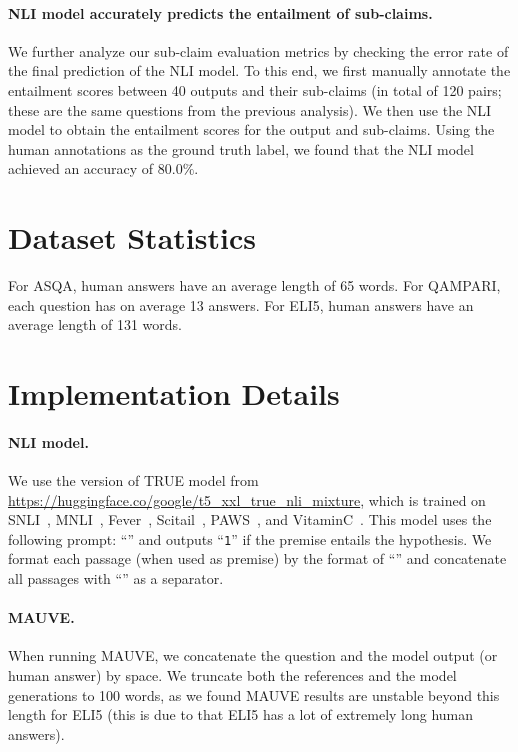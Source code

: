 \paragraph{NLI model accurately predicts the entailment of sub-claims.}
We further analyze our sub-claim evaluation metrics by checking the error rate of the final prediction of the NLI model.
To this end, we first manually annotate the entailment scores between 40 outputs and their sub-claims (in total of 120 pairs; these are the same questions from the previous analysis). 
We then use the NLI model to obtain the entailment scores for the output and sub-claims. 
Using the human annotations as the ground truth label, we found that the NLI model achieved an accuracy of $80.0\%$. 


\section{Dataset Statistics}

\label{app_sec:dataset_stats}

For ASQA, human answers have an average length of 65 words.
For QAMPARI, each question has on average 13 answers. 
For ELI5, human answers have an average length of 131 words.

\section{Implementation Details}
\label{app_sec:imp_details}

\paragraph{NLI model.} 
We use the version of TRUE model from \url{https://huggingface.co/google/t5_xxl_true_nli_mixture}, which is trained on 
SNLI~\citep{bowman2015large_snli},
MNLI~\citep{williams2018broad_mnli},
Fever~\citep{thorne-etal-2018-fever},
Scitail~\citep{khot2018scitail},
PAWS~\citep{zhang-etal-2019-paws},
and VitaminC~\citep{schuster-etal-2021-get}.
This model uses the following prompt: ``''
and outputs ``\texttt{1}'' if the premise entails the hypothesis.
We format each passage (when used as premise) 
by the format of ``'' and concatenate all passages with ``'' as a separator. 




\paragraph{MAUVE.} 
When running MAUVE, we concatenate the question and the model output (or human answer) by space. 
We truncate both the references and the model generations to 100 words, 
as we found MAUVE results are unstable beyond this length for ELI5 (this is due to that ELI5 has a lot of extremely long human answers).

